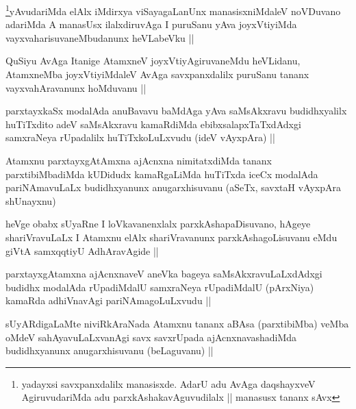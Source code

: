 \begin{artha}
\footnote[1]{yadayxsi savxpanxdalilx manasisxde. AdarU adu AvAga daqshayxveV AgiruvudariMda adu parxkAshakavAguvudilalx || manasusx tananx sAvx}yAvudariMda elAlx iMdirxya viSayagaLanUnx manasisxniMdaleV noVDuvano adariMda A manasUsx ilalxdiruvAga I puruSanu yAva joyxVtiyiMda vayxvaharisuvaneMbudanunx heVLabeVku ||
\end{artha}

\begin{artha}
QuSiyu AvAga Itanige AtamxneV joyxVtiyAgiruvaneMdu heVLidanu, AtamxneMba joyxVtiyiMdaleV AvAga savxpanxdalilx puruSanu tananx vayxvahAravanunx hoMduvanu ||
\end{artha}

\begin{artha}
parxtayxkaSx modalAda anuBavavu baMdAga yAva saMsAkxravu budidhxyalilx huTiTxdito adeV saMsAkxravu kamaRdiMda ebibxsalapxTaTxdAdxgi samxraNeya rUpadalilx huTiTxkoLuLxvudu (ideV vAyxpAra) ||
\end{artha}

\begin{artha}
Atamxnu parxtayxgAtAmxna ajAcnxna nimitatxdiMda tananx parxtibiMbadiMda kUDidudx kamaRgaLiMda huTiTxda iceCx modalAda pariNAmavuLaLx budidhxyanunx anugarxhisuvanu (aSeTx, savxtaH vAyxpAra shUnayxnu)
\end{artha}

\begin{artha}
heVge obabx sUyaRne I loVkavanenxlalx parxkAshapaDisuvano, hAgeye shariVravuLaLx I Atamxnu elAlx shariVravanunx parxkAshagoLisuvanu eMdu giVtA samxqqtiyU AdhAravAgide ||
\end{artha}

\begin{artha}
parxtayxgAtamxna ajAcnxnaveV aneVka bageya saMsAkxravuLaLxdAdxgi budidhx modalAda rUpadiMdalU samxraNeya rUpadiMdalU (pArxNiya) kamaRda adhiVnavAgi pariNAmagoLuLxvudu ||
\end{artha}

\begin{artha}
sUyARdigaLaMte niviRkAraNada Atamxnu tananx aBAsa (parxtibiMba) veMba oMdeV sahAyavuLaLxvanAgi savx savxrUpada ajAcnxnavashadiMda budidhxyanunx anugarxhisuvanu (beLaguvanu) ||
\end{artha}

